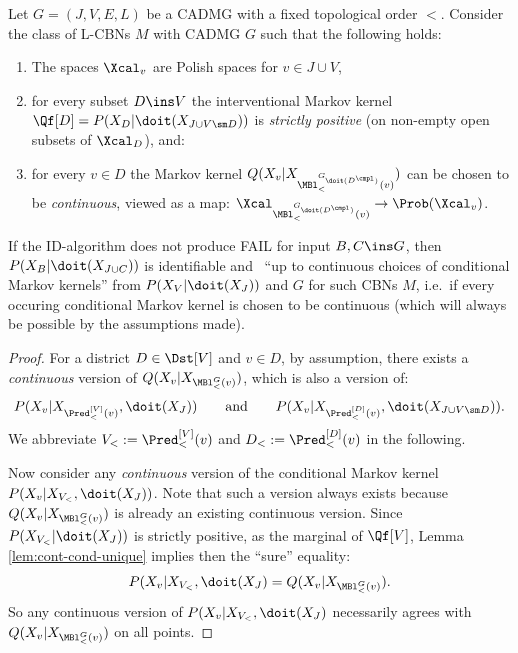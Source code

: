 \begin{Thm}
    \label{thm:ID-soundness-cont}
    Let $G=(J,V,E,L)$ be a CADMG with a fixed topological order $<$. %
    Consider the class of L-CBNs $M$ with \observational CADMG $G$ such that the following holds: 
    \begin{enumerate}
        \item The spaces $\Xcal_v$ are Polish spaces for $v \in J \cup V$,
        \item for every subset $D \ins V$ the interventional Markov kernel $\Qf[D]=P(X_D|\doit(X_{J \cup V \sm D}))$ 
            is \emph{strictly positive} (on non-empty open subsets of $\Xcal_{D}$), and:
        \item for every $v \in D$ the Markov kernel $Q(X_v|X_{\MBl^{G_{\doit(D^\cmpl)}}_<(v)})$ 
            can be chosen to be \emph{continuous}, viewed as a map: $\Xcal_{\MBl^{G_{\doit(D^\cmpl)}}_<(v)} \to \Prob(\Xcal_v)$.
    \end{enumerate}
    If the ID-algorithm does not produce FAIL for input $B, C \ins G$,
    then $P(X_B|\doit(X_{J \cup C}))$ is identifiable
    and \trackable\ ``up to continuous choices of conditional Markov kernels'' 
    from $P(X_V|\doit(X_J))$ and $G$ for such CBNs $M$, 
    i.e.\ if every occuring conditional Markov kernel is chosen to be continuous (which will always be possible by the assumptions made).
    \begin{proof}
        For a district $D \in \Dst[V]$ and $v \in D$, 
        by assumption, there exists a \emph{continuous} version of $Q(X_v|X_{\MBl^G_<(v)})$, which is also a version of:
     \[ P(X_v|X_{\Pred^{[V]}_<(v)},\doit(X_J)) \qquad \text{and} \qquad P(X_v|X_{\Pred^{[D]}_<(v)},\doit(X_{J \cup V\sm D})).\]
      We abbreviate $V_<:=\Pred^{[V]}_<(v)$ and $D_<:=\Pred^{[D]}_<(v)$ in the following.

     Now consider any \emph{continuous} version of the conditional Markov kernel $P(X_v|X_{V_<},\doit(X_J))$.
     Note that such a version always exists because $Q(X_v|X_{\MBl^G_<(v)})$ is already an existing continuous version.
     Since $P(X_{V_<}|\doit(X_J))$ is strictly positive, as the marginal of $\Qf[V]$,
      Lemma \ref{lem:cont-cond-unique} implies then the ``sure'' equality:
     \[ P(X_v|X_{V_<},\doit(X_J)=Q(X_v|X_{\MBl^G_<(v)}).  \]
     So any continuous version of $P(X_v|X_{V_<},\doit(X_J)$ necessarily agrees with $Q(X_v|X_{\MBl^G_<(v)})$ on all points.


\end{proof}
\end{Thm}
